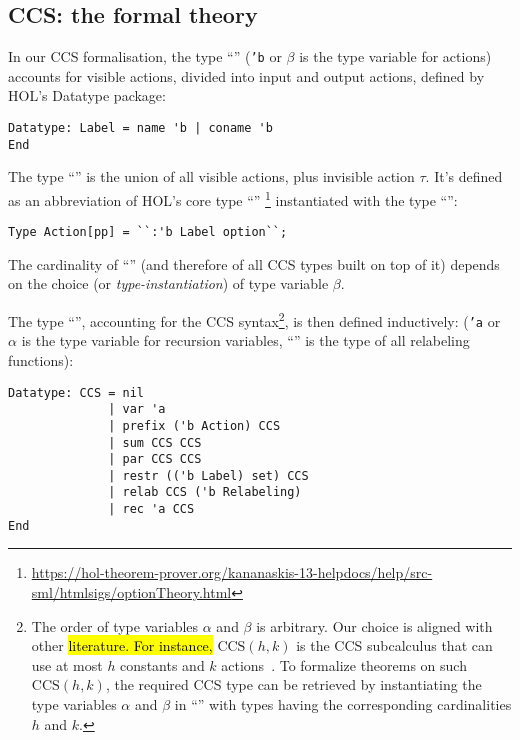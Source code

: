 
\subsection{CCS: the formal theory}



In our CCS formalisation, the type ``'' (\texttt{'b} or
$\beta$ is the type variable for actions) accounts for visible actions, divided into input
and output actions, defined by HOL's Datatype package:
\begin{lstlisting}
Datatype: Label = name 'b | coname 'b
End
\end{lstlisting}
The type ``'' is the
union of all visible actions, plus invisible action $\tau$. It's
defined as an abbreviation of HOL's core type ``''%
\footnote{\url{https://hol-theorem-prover.org/kananaskis-13-helpdocs/help/src-sml/htmlsigs/optionTheory.html}} instantiated
with the type ``'':
\begin{lstlisting}
Type Action[pp] = ``:'b Label option``;
\end{lstlisting}
The cardinality of
``'' (and therefore of all
CCS types built on top of it)
 depends on the choice (or \emph{type-instantiation}) of type variable $\beta$.

The type ``'', accounting for the CCS
syntax\footnote{The order of type variables $\alpha$ and $\beta$
    is arbitrary. Our choice is aligned with other \hl{literature.
For instance,} $\mathrm{CCS}(h,k)$ is the CCS subcalculus that can use at most $h$ constants
and $k$ actions~\cite{gorrieri2017ccs}. To formalize theorems on
such $\mathrm{CCS}(h,k)$, the required CCS type can be retrieved by instantiating the type
variables $\alpha$ and $\beta$ in ``'' with types
having the corresponding cardinalities $h$ and $k$.}, is then defined inductively:
(\texttt{'a} or $\alpha$ is the type variable for recursion variables,
``'' is the type of all relabeling functions):
\begin{lstlisting}
Datatype: CCS = nil
              | var 'a
              | prefix ('b Action) CCS
              | sum CCS CCS
              | par CCS CCS
              | restr (('b Label) set) CCS
              | relab CCS ('b Relabeling)
              | rec 'a CCS
End
\end{lstlisting}

